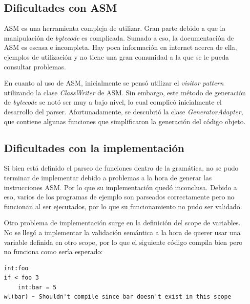 \documentclass[spanish]{article}
\begin{document}
        \subsection{Dificultades con ASM}
            \par ASM es una herramienta compleja de utilizar. Gran parte debido a que la manipulación de \textit{bytecode} es complicada. Sumado a eso, la documentación de ASM es escasa e incompleta. Hay poca información en internet acerca de ella, ejemplos de utilización y no tiene una gran comunidad a la que se le pueda consultar problemas.
            \par En cuanto al uso de ASM, inicialmente se pensó utilizar el \textit{visitor pattern} utilizando la clase \textit{ClassWriter} de ASM. Sin embargo, este método de generación de \textit{bytecode} se notó ser muy a bajo nivel, lo cual complicó inicialmente el desarrollo del parser. Afortunadamente, se descubrió la clase \textit{GeneratorAdapter}, que contiene algunas funciones que simplificaron la generación del código objeto.
        \subsection{Dificultades con la implementación}
                \par Si bien está definido el parseo de funciones dentro de la gramática, no se pudo terminar de implementar debido a problemas a la hora de generar las instrucciones ASM. Por lo que su implementación quedó inconclusa. Debido a eso, varios de los programas de ejemplo son parseados correctamente pero no funcionan al ser ejecutados, por lo que su funcionamiento no pudo ser validado.
                \par Otro problema de implementación surge en la definición del scope de variables. No se llegó a implementar la validación semántica a la hora de querer usar una variable definida en otro scope, por lo que el siguiente código compila bien pero no funciona como sería esperado:
                \begin{lstlisting}
int:foo
if < foo 3
    int:bar = 5
wl(bar) ~ Shouldn't compile since bar doesn't exist in this scope
                \end{lstlisting}
        \clearpage
\end{document}
